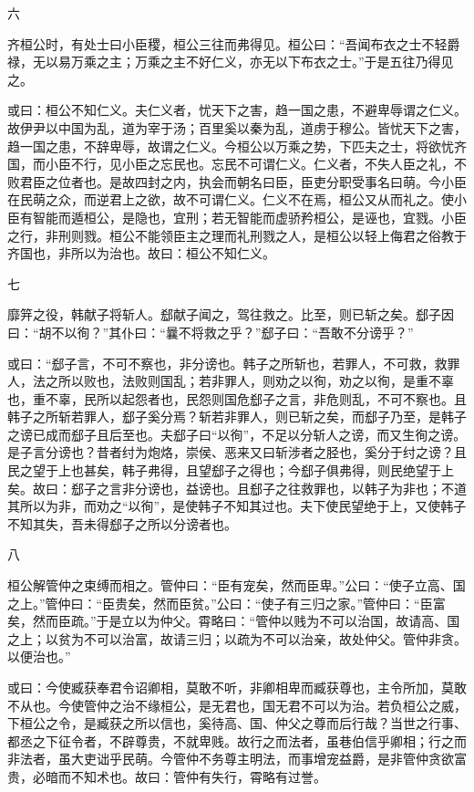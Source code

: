 \documentclass[]{article}
\begin{document}
六

齐桓公时，有处士曰小臣稷，桓公三往而弗得见。桓公曰：``吾闻布衣之士不轻爵禄，无以易万乘之主；万乘之主不好仁义，亦无以下布衣之士。''于是五往乃得见之。

或曰：桓公不知仁义。夫仁义者，忧天下之害，趋一国之患，不避卑辱谓之仁义。故伊尹以中国为乱，道为宰于汤；百里奚以秦为乱，道虏于穆公。皆忧天下之害，趋一国之患，不辞卑辱，故谓之仁义。今桓公以万乘之势，下匹夫之士，将欲忧齐国，而小臣不行，见小臣之忘民也。忘民不可谓仁义。仁义者，不失人臣之礼，不败君臣之位者也。是故四封之内，执会而朝名曰臣，臣吏分职受事名曰萌。今小臣在民萌之众，而逆君上之欲，故不可谓仁义。仁义不在焉，桓公又从而礼之。使小臣有智能而遁桓公，是隐也，宜刑；若无智能而虚骄矜桓公，是诬也，宜戮。小臣之行，非刑则戮。桓公不能领臣主之理而礼刑戮之人，是桓公以轻上侮君之俗教于齐国也，非所以为治也。故曰：桓公不知仁义。

七

靡笄之役，韩献子将斩人。郄献子闻之，驾往救之。比至，则已斩之矣。郄子因曰：``胡不以徇？''其仆曰：``曩不将救之乎？''郄子曰：``吾敢不分谤乎？''

或曰：``郄子言，不可不察也，非分谤也。韩子之所斩也，若罪人，不可救，救罪人，法之所以败也，法败则国乱；若非罪人，则劝之以徇，劝之以徇，是重不辜也，重不辜，民所以起怨者也，民怨则国危郄子之言，非危则乱，不可不察也。且韩子之所斩若罪人，郄子奚分焉？斩若非罪人，则已斩之矣，而郄子乃至，是韩子之谤已成而郄子且后至也。夫郄子曰``以徇''，不足以分斩人之谤，而又生徇之谤。是子言分谤也？昔者纣为炮烙，崇侯、恶来又曰斩涉者之胫也，奚分于纣之谤？且民之望于上也甚矣，韩子弗得，且望郄子之得也；今郄子俱弗得，则民绝望于上矣。故曰：郄子之言非分谤也，益谤也。且郄子之往救罪也，以韩子为非也；不道其所以为非，而劝之``以徇''，是使韩子不知其过也。夫下使民望绝于上，又使韩子不知其失，吾未得郄子之所以分谤者也。

八

桓公解管仲之束缚而相之。管仲曰：``臣有宠矣，然而臣卑。''公曰：``使子立高、国之上。''管仲曰：``臣贵矣，然而臣贫。''公曰：``使子有三归之家。''管仲曰：``臣富矣，然而臣疏。''于是立以为仲父。霄略曰：``管仲以贱为不可以治国，故请高、国之上；以贫为不可以治富，故请三归；以疏为不可以治亲，故处仲父。管仲非贪。以便治也。''

或曰：今使臧获奉君令诏卿相，莫敢不听，非卿相卑而臧获尊也，主令所加，莫敢不从也。今使管仲之治不缘桓公，是无君也，国无君不可以为治。若负桓公之威，下桓公之令，是臧获之所以信也，奚待高、国、仲父之尊而后行哉？当世之行事、都丞之下征令者，不辟尊贵，不就卑贱。故行之而法者，虽巷伯信乎卿相；行之而非法者，虽大吏诎乎民萌。今管仲不务尊主明法，而事增宠益爵，是非管仲贪欲富贵，必暗而不知术也。故曰：管仲有失行，霄略有过誉。
\end{document}
